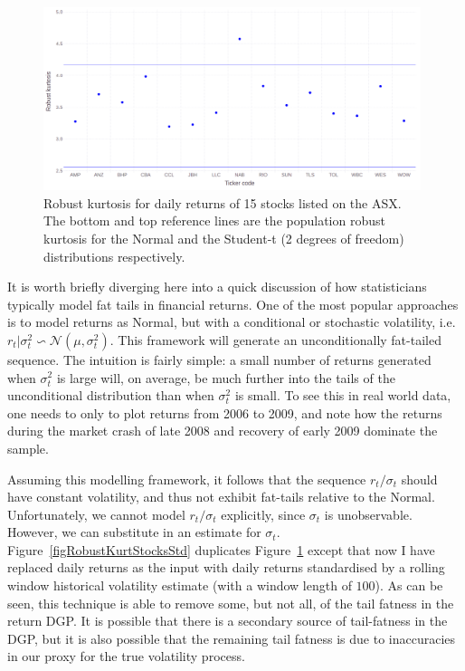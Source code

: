 \documentclass[12pt,a4paper]{amsart}
\newcommand{\m}{\mu}
\newcommand{\s}{\sigma}
\newcommand{\N}{\mathcal{N}}							%
\begin{document}
\begin{figure}[htbp]
\centering
\includegraphics[height=5.35cm]{RobustKurtStocks.png}
\caption{\footnotesize{Robust kurtosis for daily returns of 15 stocks listed on the ASX. The bottom and top reference lines are the population robust kurtosis for the Normal and the Student-t (2 degrees of freedom) distributions respectively.}}
\label{figRobustKurtStocks}
\end{figure}

It is worth briefly diverging here into a quick discussion of how statisticians typically model fat tails in financial returns. One of the most popular approaches is to model returns as Normal, but with a conditional or stochastic volatility, i.e. $r_t | \s_t^2 \backsim \N(\m, \s_t^2)$. This framework will generate an unconditionally fat-tailed sequence. The intuition is fairly simple: a small number of returns generated when $\s_t^2$ is large will, on average, be much further into the tails of the unconditional distribution than when $\s_t^2$ is small. To see this in real world data, one needs to only to plot returns from 2006 to 2009, and note how the returns during the market crash of late 2008 and recovery of early 2009 dominate the sample.

Assuming this modelling framework, it follows that the sequence $r_t / \s_t$ should have constant volatility, and thus not exhibit fat-tails relative to the Normal. Unfortunately, we cannot model $r_t / \s_t$ explicitly, since $\s_t$ is unobservable. However, we can substitute in an estimate for $\s_t$. Figure~\ref{figRobustKurtStocksStd} duplicates Figure~\ref{figRobustKurtStocks} except that now I have replaced daily returns as the input with daily returns standardised by a rolling window historical volatility estimate (with a window length of $100$). As can be seen, this technique is able to remove some, but not all, of the tail fatness in the return DGP. It is possible that there is a secondary source of tail-fatness in the DGP, but it is also possible that the remaining tail fatness is due to inaccuracies in our proxy for the true volatility process.
\end{document}
